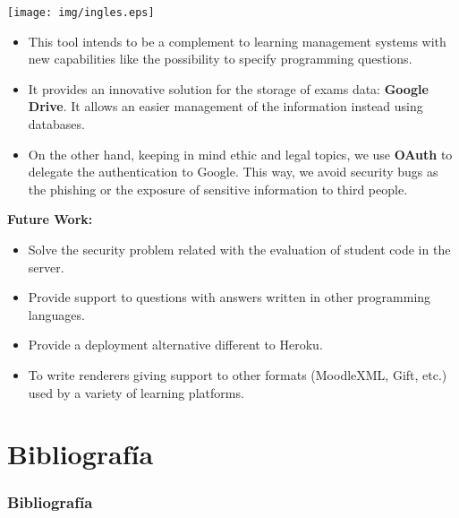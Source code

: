 \documentclass{beamer}
\begin{document}
\begin{frame}[allowframebreaks]
  \begin{center}
    \texttt{[image: img/ingles.eps]}
  \end{center}
  
  \begin{itemize}
    \item This tool intends to be a complement to learning management systems with new capabilities like the possibility to specify 
    programming questions.
    \item It provides an innovative solution for the storage of exams data: {\bfseries Google Drive}.
    It allows an easier management of the information instead using databases.
    \item On the other hand, keeping in mind ethic and legal topics, we use {\bfseries OAuth} to delegate the authentication to Google. 
    This way, we avoid security bugs as the phishing or the exposure of sensitive information to third people.
  \end{itemize}
  \framebreak
  
  {\bf Future Work:}
  \begin{itemize}
    \item Solve the security problem related with the evaluation of student code in the server.
    \item Provide support to questions with answers written in other programming languages.
    \item Provide a deployment alternative different to Heroku.
    \item To write renderers giving support to other formats (MoodleXML, Gift, etc.) used by a variety of learning platforms.
  \end{itemize}
\end{frame}


\section{Bibliografía}
\begin{frame}[allowframebreaks]
  \frametitle{Bibliografía}
  
  
  \nocite{*}
\end{frame}
\end{document}
